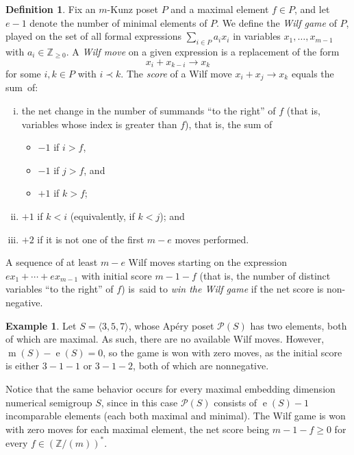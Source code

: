 \documentclass[12pt]{amsart}
\theoremstyle{definition}
\newtheorem{example}[thm]{Example}
\newtheorem{defn}[thm]{Definition}
\numberwithin{equation}{section}
\newcommand{\ring}[1]{\ensuremath{\mathbb{#1}}}
\renewcommand\>{\rangle}
\newcommand\<{\langle}
\newcommand\0{\mathbf{0}}
\newcommand\ZZ{\ring{Z}}
\begin{document}
\begin{defn}\label{d:wilfgame}
Fix an $m$-Kunz poset $P$ and a maximal element $f \in P$, and let $e - 1$ denote the number of minimal elements of $P$.  We define the \emph{Wilf game} of $P$, played on the set of all formal expressions $\sum_{i \in P} a_ix_i$ in variables $x_1, \ldots, x_{m-1}$ with $a_i \in \ZZ_{\ge 0}$.  A \emph{Wilf move} on a given expression is a replacement of the form 
$$x_i + x_{k-i} \to x_k$$
for some $i, k \in P$ with $i \prec k$.  The \emph{score} of a Wilf move $x_i + x_j \to x_k$ equals the sum~of:
\begin{enumerate}[(i)]
\item 
the net change in the number of summands ``to the right'' of $f$ (that is, variables whose index is greater than $f$), that is, the sum of
\begin{itemize}
\item 
$-1$ if $i > f$,

\item 
$-1$ if $j > f$, and

\item 
$+1$ if $k > f$;

\end{itemize}

\item 
$+1$ if $k < i$ (equivalently, if $k < j$); and

\item 
$+2$ if it is not one of the first $m - e$ moves performed.  

\end{enumerate}
A sequence of at least $m - e$ Wilf moves starting on the expression $ex_1 + \cdots + ex_{m-1}$ with initial score $m - 1 - f$ (that is, the number of distinct variables ``to the right'' of $f$) is~said to \emph{win the Wilf game} if the net score is non-negative.  
\end{defn}

\begin{example}\label{e:zero-wilfgame}
Let $S = \<3,5,7\>$, whose Ap\'ery poset $\mathcal{P}(S)$ has two elements, both of which are maximal. As such, there are no available Wilf moves.  However, $\operatorname m(S) - \operatorname e(S) = 0$, so the game is won with zero moves, as the initial score is either $3 - 1 - 1$ or $3 - 1 - 2$, both of which are nonnegative.

Notice that the same behavior occurs for every maximal embedding dimension numerical semigroup $S$, since in this case $\mathcal{P}(S)$ consists of $\operatorname{e}(S)-1$ incomparable elements (each both maximal and minimal). The Wilf game is won with zero moves for each maximal element, the net score being $m - 1 - f \ge 0$ for every $f\in (\ZZ/(m))^*$.
\end{example}
\end{document}
